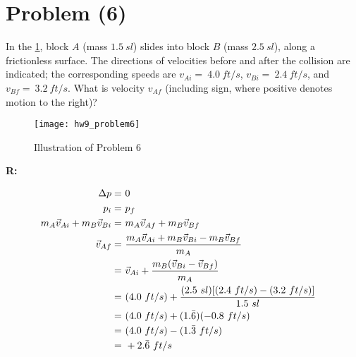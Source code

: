 \section{Problem (6)}
	In the \cref{fig:hw9_problem6}, block $A$ (mass $1.5 \ sl$) slides into block $B$ (mass $2.5 \ sl$), along a frictionless surface. The directions of velocities before and after the collision are indicated; the corresponding speeds are $v_{Ai} = \ 4.0 \ ft/s$, $v_{Bi} = \ 2.4 \ ft/s$, and $v_{Bf} = \ 3.2 \ ft/s$. What is velocity $v_{Af}$ (including sign, where positive denotes motion to the right)?

	\begin{figure}[H]
		\begin{center}
			\texttt{[image: hw9\_problem6]}
			\caption{Illustration of Problem 6}
			\label{fig:hw9_problem6}
		\end{center}
	\end{figure}

	\textbf{R:}

	\begin{align}
		\Delta p = \ &0& \notag \\
		p_{i} = \ &p_{f}& \notag \\
		m_{A}\vec{v}_{Ai} + m_{B}\vec{v}_{Bi} = \ &m_{A}\vec{v}_{Af} + m_{B}\vec{v}_{Bf}& \notag \\
		\vec{v}_{Af} = \ &\frac{m_{A}\vec{v}_{Ai} + m_{B}\vec{v}_{Bi} - m_{B}\vec{v}_{Bf}}{m_{A}}& \notag \\
		= \ &\vec{v}_{Ai} + \frac{m_{B}(\vec{v}_{Bi} - \vec{v}_{Bf})}{m_{A}}& \notag \\
		= \ &(4.0 \ ft/s) + \frac{(2.5 \ sl)[(2.4 \ ft/s) - (3.2 \ ft/s)]}{1.5 \ sl}& \notag \\
		= \ &(4.0 \ ft/s) + (1.\bar{6})(-0.8 \ ft/s)& \notag \\
		= \ &(4.0 \ ft/s) - (1.\bar{3} \ ft/s)& \notag \\
		= \ &+ 2.\bar{6} \ ft/s&
	\end{align}

